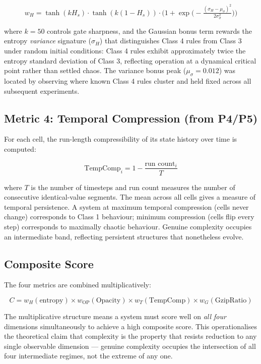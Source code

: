 \documentclass[12pt,a4paper]{article}
\begin{document}
\begin{equation}
w_H = \tanh(kH_s)\cdot\tanh(k(1-H_s))\cdot\bigl(1 + \exp\!\bigl(-\tfrac{(\sigma_H - \mu_\sigma)^2}{2\sigma_\sigma^2}\bigr)\bigr)
\end{equation}

where $k=50$ controls gate sharpness, and the Gaussian bonus term
rewards the entropy \emph{variance} signature ($\sigma_H$) that
distinguishes Class 4 rules from Class 3 under random initial
conditions: Class 4 rules exhibit approximately twice the entropy
standard deviation of Class 3, reflecting operation at a dynamical
critical point rather than settled chaos.
The variance bonus peak ($\mu_\sigma = 0.012$) was located by
observing where known Class 4 rules cluster and held fixed across
all subsequent experiments.

\subsection{Metric 4: Temporal Compression (from P4/P5)}

For each cell, the run-length compressibility of its state history
over time is computed:

\begin{equation}
\text{TempComp}_i = 1 - \frac{\text{run count}_i}{T}
\end{equation}

where $T$ is the number of timesteps and run count measures the number
of consecutive identical-value segments.
The mean across all cells gives a measure of temporal persistence.
A system at maximum temporal compression (cells never change) corresponds
to Class 1 behaviour; minimum compression (cells flip every step)
corresponds to maximally chaotic behaviour.
Genuine complexity occupies an intermediate band, reflecting persistent
structures that nonetheless evolve.

\subsection{Composite Score}

The four metrics are combined multiplicatively:

\begin{equation}
C = w_H(\text{entropy}) \times w_\text{OP}(\text{Opacity}) \times w_T(\text{TempComp}) \times w_G(\text{GzipRatio})
\end{equation}

The multiplicative structure means a system must score well on \emph{all four}
dimensions simultaneously to achieve a high composite score.
This operationalises the theoretical claim that complexity is the
property that resists reduction to any single observable dimension —
genuine complexity occupies the intersection of all four intermediate
regimes, not the extreme of any one.
\end{document}
